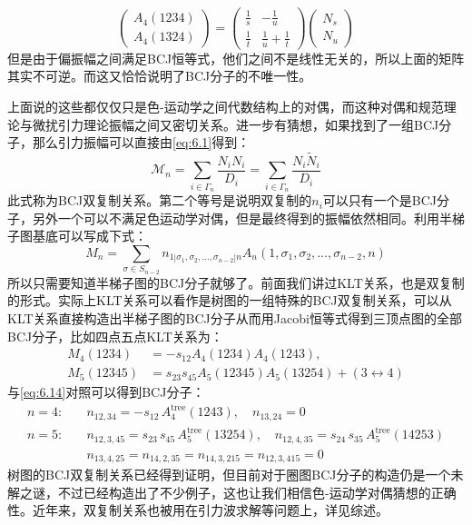 \begin{equation}
	\begin{pmatrix}A_4(1234)\\A_4(1324)\end{pmatrix}=\begin{pmatrix}\frac{1}{s}&-\frac{1}{u}\\\frac{1}{t}&\frac{1}{u}+\frac{1}{t}\end{pmatrix}\begin{pmatrix}N_s\\N_u\end{pmatrix}
\end{equation}
但是由于偏振幅之间满足BCJ恒等式，他们之间不是线性无关的，所以上面的矩阵其实不可逆。而这又恰恰说明了BCJ分子的不唯一性。

上面说的这些都仅仅只是色-运动学之间代数结构上的对偶，而这种对偶和规范理论与微扰引力理论振幅之间又密切关系。进一步有猜想，如果找到了一组BCJ分子，那么引力振幅可以直接由\ref{eq:6.1}得到：
\begin{equation}
	\mathcal{M}_n=\sum_{i\in\Gamma_n}\frac{N_iN_i}{D_i}=\sum_{i\in\Gamma_n}\frac{N_i\tilde{N}_i}{D_i}
\end{equation}
此式称为BCJ双复制关系。第二个等号是说明双复制的$n_i$可以只有一个是BCJ分子，另外一个可以不满足色运动学对偶，但是最终得到的振幅依然相同。利用半梯子图基底可以写成下式：
\begin{equation}
	\label{eq:6.14}
	M_n=\sum_{\sigma\in S_{n-2}}n_{1|\sigma_1,\sigma_2,\ldots,\sigma_{n-2}|n}A_n(1,\sigma_1,\sigma_2,\ldots,\sigma_{n-2},n)
\end{equation}
所以只需要知道半梯子图的BCJ分子就够了。前面我们讲过KLT关系，也是双复制的形式。实际上KLT关系可以看作是树图的一组特殊的BCJ双复制关系，可以从KLT关系直接构造出半梯子图的BCJ分子从而用Jacobi恒等式得到三顶点图的全部BCJ分子，比如四点五点KLT关系为：
\begin{equation}
\begin{aligned}
	M_4(1234)&=-s_{12}A_4(1234)A_4(1243),\\M_5(12345)&=s_{23}s_{45}A_5(12345)A_5(13254)+(3\leftrightarrow4)
\end{aligned}
\end{equation}
与\ref{eq:6.14}对照可以得到BCJ分子：
\begin{equation}
	\begin{aligned}
		n=4:\quad & n_{12,34} = -s_{12}\,A^{\text{tree}}_{4}(1243), \quad n_{13,24} = 0 \\
		n=5:\quad & n_{12,3,45} = s_{23}\,s_{45}\,A^{\text{tree}}_{5}(13254), \quad n_{12,4,35} = s_{24}\,s_{35}\,A^{\text{tree}}_{5}(14253) \\
		& n_{13,4,25} = n_{14,2,35} = n_{14,3,215} = n_{12,3,415} = 0
	\end{aligned}
\end{equation}
树图的BCJ双复制关系已经得到证明\cite{Bern:2010yg}，但目前对于圈图BCJ分子的构造仍是一个未解之谜，不过已经构造出了不少例子\cite{Bern:2010ue,Bern:2012uf}，这也让我们相信色-运动学对偶猜想的正确性。近年来，双复制关系也被用在引力波求解等问题上，详见综述\cite{Bern:2019prr,Adamo:2022dcm,Bern:2022wqg}。

